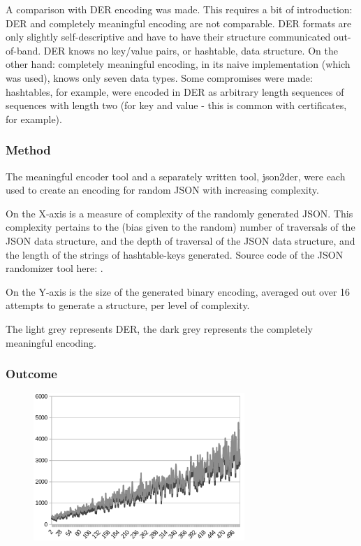 A comparison with DER encoding was made. This requires a bit of
introduction: DER and completely meaningful encoding
are not comparable. DER formats
are only slightly self-descriptive and have to have their structure
communicated
out-of-band. DER knows no key/value pairs, or hashtable, data structure.
On the other hand: completely meaningful encoding, in its naive
implementation (which was used), knows only seven data types.
Some compromises were made: hashtables, for example, were encoded
in DER as arbitrary length sequences of
sequences with length two (for key and value - this is common with
certificates, for example).

\subsubsection{Method}

The meaningful encoder tool and a separately written tool, json2der, were
each used to create an encoding for random JSON with increasing complexity.

On the X-axis is a measure of complexity of the randomly generated
JSON. This complexity pertains to the (bias given to the random) number
of traversals of
the JSON data structure, and the
depth of traversal of the JSON data structure, and the length
of the strings of hashtable-keys generated. Source code of the
JSON randomizer tool here: \cite{bib:randomizer}.

On the Y-axis is the size of the generated binary encoding, averaged
out over 16 attempts to generate a structure, per level of complexity.

The light grey represents DER, the dark grey represents the completely
meaningful encoding.

\subsubsection{Outcome}

\begin{figure}[H]
\centering
\includegraphics[width=80mm]{comparison_chart}
\end{figure}

